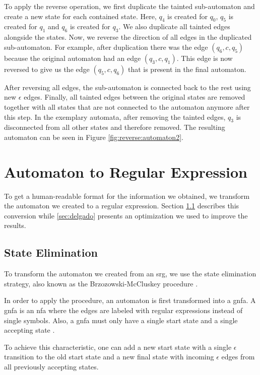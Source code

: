 To apply the reverse operation, we first duplicate the tainted sub-automaton and create a new state for each contained state. Here, $q_4$ is created for $q_0$, $q_5$ is created for $q_1$ and $q_6$ is created for $q_3$. We also duplicate all tainted edges alongside the states.
Now, we reverse the direction of all edges in the duplicated sub-automaton.
For example, after duplication there was the edge $(q_6, c, q_5)$ because the original automaton had an edge $(q_3,c,q_1)$. This edge is now reversed to give us the edge $(q_5, c, q_6)$ that is present in the final automaton.

After reversing all edges, the sub-automaton is connected back to the rest using new $\epsilon$ edges.
Finally, all tainted edges between the original states are removed together with all states that are not connected to the automaton anymore after this step.
In the exemplary automata, after removing the tainted edges, $q_3$ is disconnected from all other states and therefore removed.
The resulting automaton can be seen in Figure \ref{fig:reverse:automaton2}.
\newpage
\section{Automaton to Regular Expression}\label{sec:nfa2regex}

To get a human-readable format for the information we obtained, we transform the automaton we created to a regular expression. Section \ref{sec:stateElimination} describes this conversion while \ref{sec:delgado} presents an optimization we used to improve the results.

\subsection{State Elimination}\label{sec:stateElimination}

To transform the automaton we created from an \ac{srg}, we use the state elimination strategy, also known as the Brzozowski-McCluskey procedure \cite{brzozowksi_mccluskey}.

In order to apply the procedure, an automaton is first transformed into a \ac{gnfa}. A \ac{gnfa} is an \ac{nfa} where the edges are labeled with regular expressions instead of single symbols.
Also, a \ac{gnfa} must only have a single start state and a single accepting state \cite{hanGNFA}.

To achieve this characteristic, one can add a new start state with a single $\epsilon$ transition to the old start state and a new final state with incoming $\epsilon$ edges from all previously accepting states.

